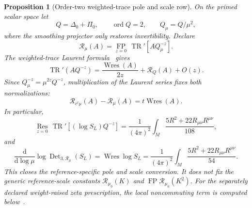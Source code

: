 \documentclass[11pt]{article}
\newtheorem{proposition}[theorem]{Proposition}
\theoremstyle{definition}
\theoremstyle{remark}
\newcommand{\dd}{\mathrm d}
\begin{document}
\begin{proposition}[Order-two weighted-trace pole and scale row]
On the primed scalar space let
\[
 Q=\Delta_0+\Pi_0,\qquad \operatorname{ord}Q=2,
 \qquad Q_\mu=Q/\mu^2,
\]
where the smoothing projector only restores invertibility.  Declare
\[
 \mathcal R_\mu(A)=\underset{z=0}{\operatorname{FP}}\,
 \operatorname{TR}'\!\left[AQ_\mu^{-z}\right].
\]
The weighted-trace Laurent formula~\cite{PaychaWeightedTrace} gives
\[
 \operatorname{TR}'(AQ^{-z})
 =\frac{\operatorname{Wres}(A)}{2z}+\mathcal R_Q(A)+O(z).
\]
Since $Q_\mu^{-z}=\mu^{2z}Q^{-z}$, multiplication of the Laurent series
fixes both normalizations:
\[
 \mathcal R_{e^t\mu}(A)-\mathcal R_\mu(A)
 =t\operatorname{Wres}(A).
\]
In particular,
\[
 \underset{z=0}{\operatorname{Res}}\,
 \operatorname{TR}'\!\left[(\log S_L)Q^{-z}\right]
 =\frac1{(4\pi)^2}\int_M
 \frac{5R^2+22R_{\mu\nu}R^{\mu\nu}}{108},
\]
and
\[
 \boxed{
 \frac{\dd}{\dd\log\mu}
 \log\operatorname{Det}_{3,\mathcal R_\mu}(S_L)
 =\operatorname{Wres}\log S_L
 =\frac1{(4\pi)^2}\int_M
 \frac{5R^2+22R_{\mu\nu}R^{\mu\nu}}{54}.}
\]
This closes the reference-specific pole and scale conversion.  It does not
fix the generic reference-scale constants $\mathcal R_{\mu_0}(K)$ and
$\operatorname{FP}\mathcal R_{\mu_0}(K^2)$.  For the separately declared
weight-raised zeta prescription, the local noncommuting term is computed
below~\cite{KontsevichVishik,OuedraogoPaycha}.
\end{proposition}
\end{document}
